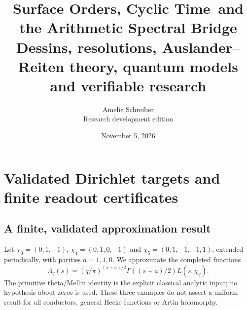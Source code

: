 \documentclass[11pt,oneside,openany]{book}
\title{Surface Orders, Cyclic Time\ and the Arithmetic Spectral Bridge\\[1em]\large Dessins, resolutions, Auslander--Reiten theory, quantum models and verifiable research}
\author{Amelie Schreiber\\\small Research development edition}
\date{November 5, 2026}
\theoremstyle{definition}\newtheorem{definition}[theorem]{Definition}
\theoremstyle{remark}\newtheorem{remark}[theorem]{Remark}
\begin{document}
\chapter{Validated Dirichlet targets and finite readout certificates}
\section{A finite, validated approximation result}
Let $\chi_3=(0,1,-1)$, $\chi_4=(0,1,0,-1)$ and
$\chi_5=(0,1,-1,-1,1)$, extended periodically, with parities $a=1,1,0$.
We approximate the completed functions
\[
 \Lambda_q(s)=(q/\pi)^{(s+a)/2}\Gamma((s+a)/2)L(s,\chi_q).
\]
The primitive theta/Mellin identity is the explicit classical analytic input;
no hypothesis about zeros is used. These three examples do not assert a
uniform result for all conductors, general Hecke functions or Artin holomorphy.
\end{document}
